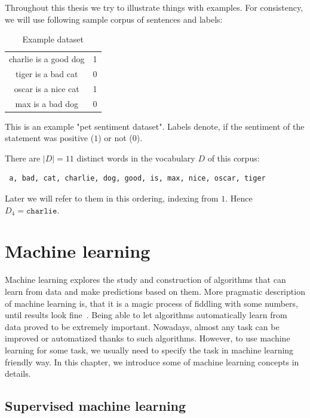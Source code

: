     Throughout this thesis we try to illustrate things with examples. 
    For consistency, we will use following sample corpus of sentences and labels:
    
    \begin{table}[h]
        \centering
        \begin{tabular}{c|c}
        \hline
            charlie is a good dog & 1 \\
            tiger is a bad cat & 0 \\
            oscar is a nice cat & 1 \\
            max is a bad dog & 0 \\
        \end{tabular}
        \caption{Example dataset}
        \label{tab:example:dataset}

    \end{table}
    
    This is an example "pet sentiment dataset". Labels denote, if the sentiment of the statement was positive ($1$) or not ($0$). 

    There are $|D|=11$ distinct words in the vocabulary $D$ of this corpus: 
    \begin{verbatim} a, bad, cat, charlie, dog, good, is, max, nice, oscar, tiger \end{verbatim}
    
    Later we will refer to them in this ordering, indexing from $1$. 
    Hence $D_4=\mathtt{charlie}$.


\section{Machine learning}
    
    Machine learning explores the study and construction of algorithms that can learn from data and make predictions based on them.
    More pragmatic description of machine learning is, that it is a magic process of fiddling with some numbers, until results look fine~\cite{boza2018}. 
    Being able to let algorithms automatically learn from data proved to be extremely important.
    Nowadays, almost any task can be improved or automatized thanks to such algorithms. 
    However, to use machine learning for some task, we usually need to specify the task in machine learning friendly way.    
    In this chapter, we introduce some of machine learning concepts in details.


    \subsection{Supervised machine learning}
    
